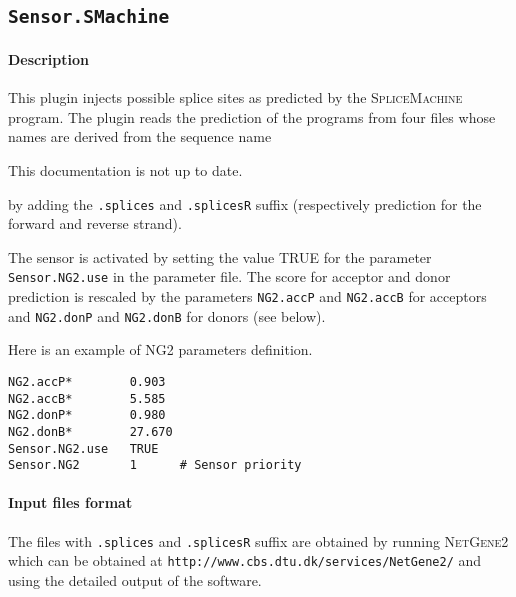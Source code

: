 
\subsection{\texttt{Sensor.SMachine}}

\paragraph{Description}

This plugin injects possible splice sites as predicted by the
\textsc{SpliceMachine} program. The plugin reads the prediction of the
programs from four files whose names are derived from the sequence name

This documentation is not up to date.

by adding the \texttt{.splices} and \texttt{.splicesR} suffix
(respectively prediction for the forward and reverse strand).

The sensor is activated by setting the value TRUE for the parameter
\texttt{Sensor.NG2.use} in the parameter file. The score for acceptor
and donor prediction is rescaled by the parameters {\tt NG2.accP} and
{\tt NG2.accB} for acceptors and {\tt NG2.donP} and {\tt NG2.donB} for
donors (see below).

Here is an example of NG2 parameters definition.
\begin{Verbatim}[fontsize=\small]
NG2.accP*        0.903
NG2.accB*        5.585
NG2.donP*        0.980
NG2.donB*        27.670
Sensor.NG2.use   TRUE
Sensor.NG2       1      # Sensor priority
\end{Verbatim}

\paragraph{Input files format}

The files with \texttt{.splices} and \texttt{.splicesR} suffix are
obtained by running \textsc{NetGene2} which can be obtained at
\texttt{http://www.cbs.dtu.dk/services/NetGene2/} and using the
detailed output of the software.

